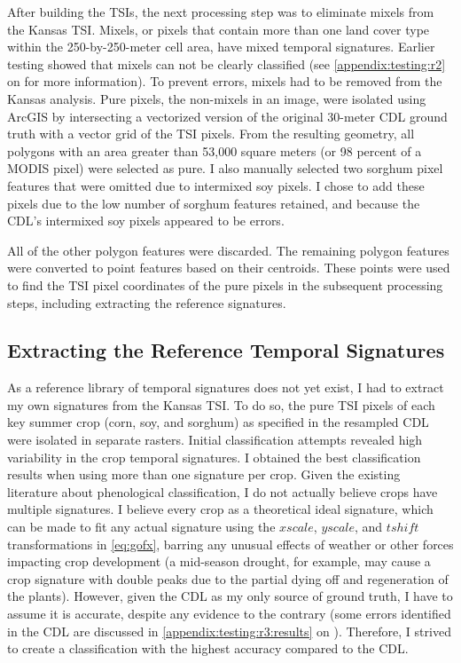 After building the TSIs, the next processing step was to eliminate mixels from the Kansas TSI. Mixels, or pixels that contain more than one land cover type within the 250-by-250-meter cell area, have mixed temporal signatures. Earlier testing showed that mixels can not be clearly classified (see \autoref{appendix:testing:r2} on  for more information). To prevent errors, mixels had to be removed from the Kansas analysis. Pure pixels, the non-mixels in an image, were isolated using ArcGIS \autocite{arcgis10.1} by intersecting a vectorized version of the original 30-meter CDL ground truth with a vector grid of the TSI pixels. From the resulting geometry, all polygons with an area greater than 53,000 square meters (or 98 percent of a MODIS pixel) were selected as pure. I also manually selected two sorghum pixel features that were omitted due to intermixed soy pixels. I chose to add these pixels due to the low number of sorghum features retained, and because the CDL's intermixed soy pixels appeared to be errors.

All of the other polygon features were discarded. The remaining polygon features were converted to point features based on their centroids. These points were used to find the TSI pixel coordinates of the pure pixels in the subsequent processing steps, including extracting the reference signatures. 

\subsection{Extracting the Reference Temporal Signatures}
\label{methods:sigextraction}

As a reference library of temporal signatures does not yet exist, I had to extract my own signatures from the Kansas TSI. To do so, the pure TSI pixels of each key summer crop (corn, soy, and sorghum) as specified in the resampled CDL were isolated in separate rasters. Initial classification attempts revealed high variability in the crop temporal signatures. I obtained the best classification results when using more than one signature per crop. Given the existing literature about phenological classification, I do not actually believe crops have multiple signatures. I believe every crop as a theoretical ideal signature, which can be made to fit any actual signature using the $xscale$, $yscale$, and $tshift$ transformations in \autoref{eq:gofx}, barring any unusual effects of weather or other forces impacting crop development (a mid-season drought, for example, may cause a crop signature with double peaks due to the partial dying off and regeneration of the plants). However, given the CDL as my only source of ground truth, I have to assume it is accurate, despite any evidence to the contrary (some errors identified in the CDL are discussed in \autoref{appendix:testing:r3:results} on ).
Therefore, I strived to create a classification with the highest accuracy compared to the CDL.

